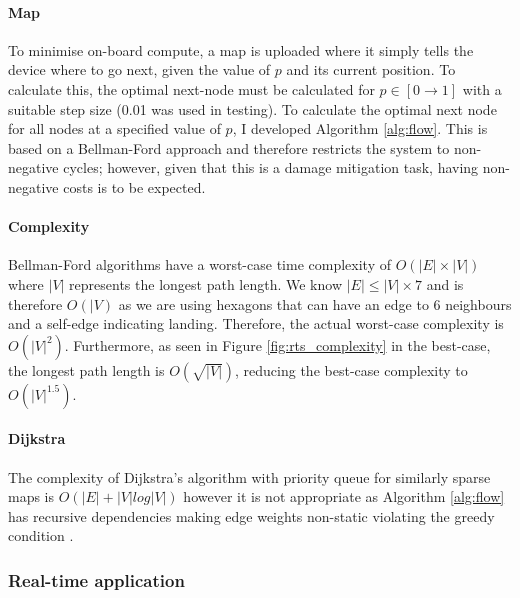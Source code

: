 \paragraph{Map}

To minimise on-board compute, a map is uploaded where it simply tells the device where to go next, given the value of $p$ and its current position. To calculate this, the optimal next-node must be calculated for $p\in[0\to1]$ with a suitable step size (0.01 was used in testing).  To calculate the optimal next node for all nodes at a specified value of $p$, I developed Algorithm \ref{alg:flow}. This is based on a Bellman-Ford \cite{bellman1958}\cite{ford1956} approach and therefore restricts the system to non-negative cycles; however, given that this is a damage mitigation task, having non-negative costs is to be expected.
\paragraph{Complexity}
Bellman-Ford algorithms have a worst-case time complexity of $O(|E|\times |V|)$ where $|V|$ represents the longest path length. We know $|E| \leq |V| \times 7$ and is therefore $O(|V)$ as we are using hexagons that can have an edge to 6 neighbours and a self-edge indicating landing. Therefore, the actual worst-case complexity is $O(|V|^2)$\cite{cormen2009}.  Furthermore, as seen in Figure \ref{fig:rts_complexity} in the best-case, the longest path length is $O(\sqrt{|V|})$, reducing the best-case complexity to $O(|V|^{1.5})$. 

\paragraph{Dijkstra}
The complexity of Dijkstra's algorithm \cite{dijkstra1959} with priority queue for similarly sparse maps is $O(|E| + |V|log|V|)$ however it is not appropriate as Algorithm \ref{alg:flow} has recursive dependencies making edge weights non-static violating the greedy condition \cite{cormen2009}. 
\subsubsection{Real-time application}\label{sub_sub_section:tgt_real_time}
